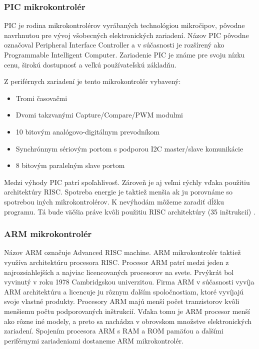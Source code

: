 \subsubsection{PIC mikrokontrolér}
\noindent \par
PIC je rodina mikrokontrolérov vyrábaných technológiou mikročipov, pôvodne navrhnutou pre vývoj všobecných elektronických zariadení.
Názov PIC pôvodne označoval Peripheral Interface Controller a v súčasnosti je
rozšírený ako Programmable Intelligent Computer. Zariadenie PIC je známe pre
svoju nízku cenu, širokú dostupnosť a veľkú používateľskú základňu. \par

Z periférnych zariadení je tento mikrokontrolér vybavený:
\begin{itemize}
    \item Tromi časovačmi
    \item Dvomi takzvanými Capture/Compare/PWM modulmi
    \item 10 bitovým analógovo-digitálnym prevodníkom
    \item Synchrónnym sériovým portom s podporou \acrshort{I2C} master/slave komunikácie
    \item 8 bitovým paralelným slave portom
\end{itemize}

Medzi výhody PIC patrí spoľahlivosť. Zároveň je aj veľmi rýchly vďaka použitiu architektúry RISC.
Spotreba energie je taktiež menšia ak ju porovnáme so spotrebou iných mikrokontrolérov. K nevýhodám môžeme zaradiť dĺžku programu.
Tá bude väčšia práve kvôli použitiu \acrshort{RISC} architektúry (35 inštrukcií) \cite{shidlingDifferentTypesMicrocontrollers2020}.

\subsubsection{ARM mikrokontrolér}
\noindent \par
Názov \acrshort{ARM} označuje Advanced RISC machine. ARM mikrokontrolér taktiež využíva architektúru procesora RISC. Procesor ARM patrí medzi jeden z najrozsiahlejších
a najviac licencovaných procesorov na svete. Prvýkrát bol vyvinutý v roku 1978 Cambridgskou univerzitou. Firma ARM v súčasnosti vyvíja ARM architektúru a
licencuje ju rôznym ďalším spoločnostiam, ktoré vyvíjajú svoje vlastné produkty.
Procesory ARM majú menší počet tranzistorov kvôli menšiemu počtu podporovaných inštrukcií. Vďaka tomu je ARM procesor menší ako rôzne iné modely, a preto sa nachádza v obrovskom množstve elektronických zariadení. Spojením procesora ARM
s \acrshort{RAM} a \acrshort{ROM} pamäťou a ďalšími periférnymi zariadeniami dostaneme ARM mikrokontrolér.\par

